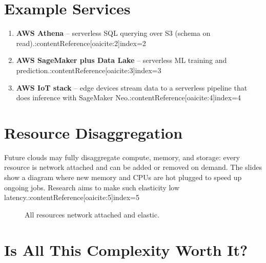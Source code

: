 \documentclass[11pt]{article}
\begin{document}
\section{Example Services}

\begin{enumerate}[itemsep=0pt]
  \item \textbf{AWS Athena} -- serverless SQL querying over S3 (schema on read).:contentReference[oaicite:2]{index=2}
  \item \textbf{AWS SageMaker plus Data Lake} -- serverless ML training and prediction.:contentReference[oaicite:3]{index=3}
  \item \textbf{AWS IoT stack} -- edge devices stream data to a serverless pipeline that does inference with SageMaker Neo.:contentReference[oaicite:4]{index=4}
\end{enumerate}

\section{Resource Disaggregation}

Future clouds may fully disaggregate compute, memory, and storage: every resource is network attached and can be added or removed on demand.  The slides show a diagram where new memory and CPUs are hot plugged to speed up ongoing jobs.  Research aims to make such elasticity low latency.:contentReference[oaicite:5]{index=5}

\begin{figure}[h]
  \centering
  \caption{All resources network attached and elastic.}
\end{figure}

\section{Is All This Complexity Worth It?}
\end{document}
